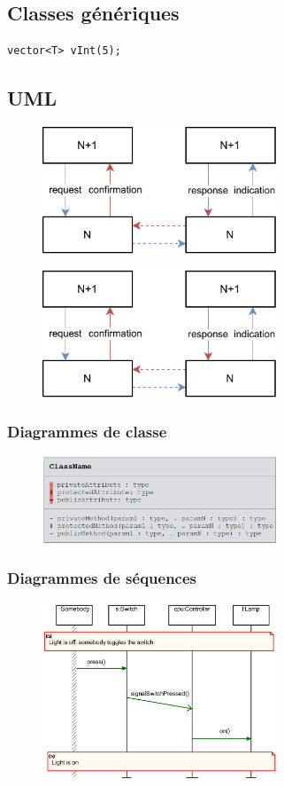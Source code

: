 \documentclass[resume]{subfiles}
\begin{document}
\subsection{Classes génériques}
\begin{lstlisting}[style=Cpp]
vector<T> vInt(5);
\end{lstlisting}
\subsection{UML}
\begin{figure}[H]
\centering
\includegraphics[width=7cm,page=3]{Schemas-crop.pdf}
\end{figure}
\begin{figure}[H]
\centering
\includegraphics[width=7cm,page=2]{Schemas-crop.pdf}
\end{figure}

\subsubsection{Diagrammes de classe}
\begin{figure}[H]
\centering
\includegraphics[width=7cm]{Figures/UML/diagClass.png}
\end{figure}

\subsubsection{Diagrammes de séquences}
\begin{figure}[H]
\centering
\includegraphics[width=7cm]{img_0.pdf}
\end{figure}
\end{document}
